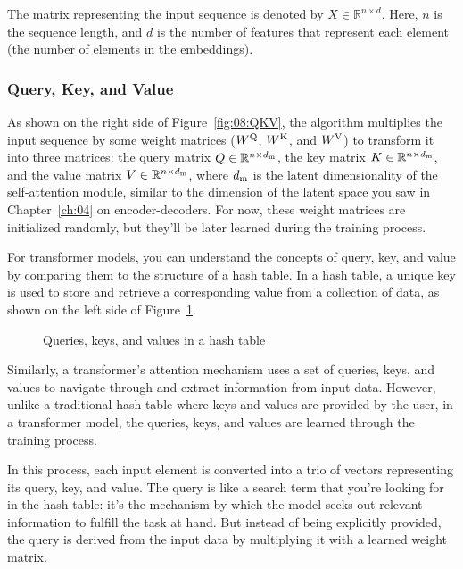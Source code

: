 The matrix representing the input sequence is denoted by $X \in \mathbb{R}^{n \times d}$. Here, $n$ is the sequence length, and $d$ is the number of features that represent each element (the number of elements in the embeddings).

\subsubsection{Query, Key, and Value}

As shown on the right side of Figure~\ref{fig:08:QKV}, the algorithm multiplies the input sequence by some weight matrices ($W^{\rm Q}$, $W^{\rm K}$, and $W^{\rm V}$) to transform it into three matrices: the query matrix $Q \in \mathbb{R}^{n \times d_{\rm m}}$, the key matrix $K \in \mathbb{R}^{n \times d_{\rm m}}$, and the value matrix $V \in \mathbb{R}^{n \times d_{\rm m}}$, where $d_{\rm m}$ is the latent dimensionality of the self-attention module, similar to the dimension of the latent space you saw in Chapter~\ref{ch:04} on encoder-decoders. 
For now, these weight matrices are initialized randomly, but they'll be later learned during the training process.

For transformer models, you can understand the concepts of query, key, and value by comparing them to the structure of a hash table. In a hash table, a unique key is used to store and retrieve a corresponding value from a collection of data, as shown on the left side of Figure~\ref{fig:08:hash}.

\begin{figure}[H]
    \caption{Queries, keys, and values in a hash table}
    \label{fig:08:hash}
\end{figure}

Similarly, a transformer's attention mechanism uses a set of queries, keys, and values to navigate through and extract information from input data.
However, unlike a traditional hash table where keys and values are provided by the user, in a transformer model, the queries, keys, and values are learned through the training process.

In this process, each input element is converted into a trio of vectors representing its query, key, and value. 
The query is like a search term that you're looking for in the hash table: it's the mechanism by which the model seeks out relevant information to fulfill the task at hand. But instead of being explicitly provided, the query is derived from the input data by multiplying it with a learned weight matrix.

